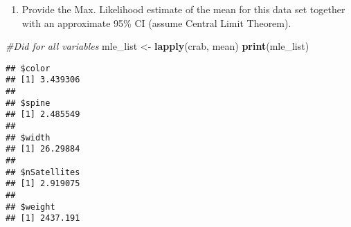 \documentclass[]{article}
\newenvironment{Shaded}{\begin{snugshade}}{\end{snugshade}}
\newcommand{\KeywordTok}[1]{\textcolor[rgb]{0.13,0.29,0.53}{\textbf{#1}}}
\newcommand{\StringTok}[1]{\textcolor[rgb]{0.31,0.60,0.02}{#1}}
\newcommand{\CommentTok}[1]{\textcolor[rgb]{0.56,0.35,0.01}{\textit{#1}}}
\newcommand{\NormalTok}[1]{#1}
\providecommand{\tightlist}{%
  \setlength{\itemsep}{0pt}\setlength{\parskip}{0pt}}
\begin{document}
\begin{enumerate}
\def\labelenumi{\alph{enumi})}
\setcounter{enumi}{3}
\tightlist
\item
  Provide the Max. Likelihood estimate of the mean for this data set
  together with an approximate 95\% CI (assume Central Limit Theorem).
\end{enumerate}

\begin{Shaded}
\begin{Highlighting}[]
\CommentTok{#Did for all variables }
\NormalTok{mle_list <-}\StringTok{ }\KeywordTok{lapply}\NormalTok{(crab, mean)}
\KeywordTok{print}\NormalTok{(mle_list)}
\end{Highlighting}
\end{Shaded}

\begin{verbatim}
## $color
## [1] 3.439306
## 
## $spine
## [1] 2.485549
## 
## $width
## [1] 26.29884
## 
## $nSatellites
## [1] 2.919075
## 
## $weight
## [1] 2437.191
\end{verbatim}
\end{document}
